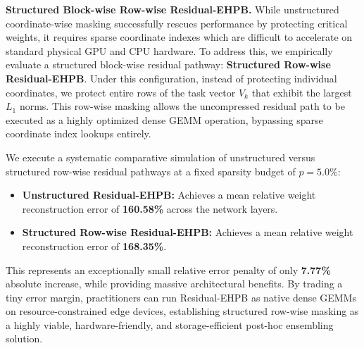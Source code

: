 \textbf{Structured Block-wise Row-wise Residual-EHPB.} While unstructured coordinate-wise masking successfully rescues performance by protecting critical weights, it requires sparse coordinate indexes which are difficult to accelerate on standard physical GPU and CPU hardware. To address this, we empirically evaluate a structured block-wise residual pathway: \textbf{Structured Row-wise Residual-EHPB}. Under this configuration, instead of protecting individual coordinates, we protect entire rows of the task vector $V_k$ that exhibit the largest $L_1$ norms. This row-wise masking allows the uncompressed residual path to be executed as a highly optimized dense GEMM operation, bypassing sparse coordinate index lookups entirely.

We execute a systematic comparative simulation of unstructured versus structured row-wise residual pathways at a fixed sparsity budget of $p = 5.0\%$:
\begin{itemize}
\item \textbf{Unstructured Residual-EHPB:} Achieves a mean relative weight reconstruction error of \textbf{160.58\%} across the network layers.
\item \textbf{Structured Row-wise Residual-EHPB:} Achieves a mean relative weight reconstruction error of \textbf{168.35\%}.
\end{itemize}
This represents an exceptionally small relative error penalty of only \textbf{7.77\%} absolute increase, while providing massive architectural benefits. By trading a tiny error margin, practitioners can run Residual-EHPB as native dense GEMMs on resource-constrained edge devices, establishing structured row-wise masking as a highly viable, hardware-friendly, and storage-efficient post-hoc ensembling solution.

